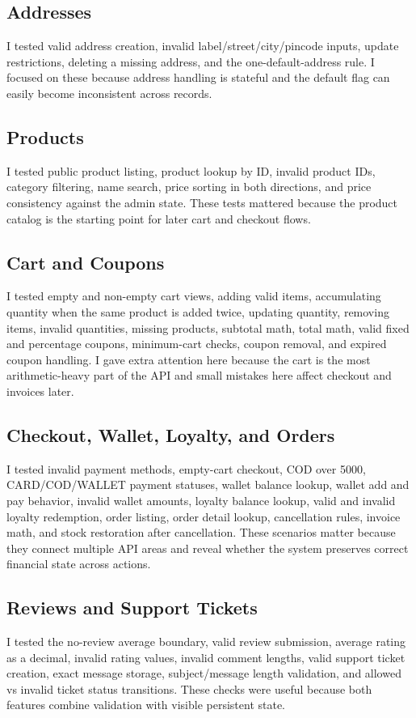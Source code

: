 \documentclass[12pt]{article}
\begin{document}
\subsection{Addresses}
I tested valid address creation, invalid label/street/city/pincode inputs, update restrictions, deleting a missing address, and the one-default-address rule. I focused on these because address handling is stateful and the default flag can easily become inconsistent across records.

\subsection{Products}
I tested public product listing, product lookup by ID, invalid product IDs, category filtering, name search, price sorting in both directions, and price consistency against the admin state. These tests mattered because the product catalog is the starting point for later cart and checkout flows.

\subsection{Cart and Coupons}
I tested empty and non-empty cart views, adding valid items, accumulating quantity when the same product is added twice, updating quantity, removing items, invalid quantities, missing products, subtotal math, total math, valid fixed and percentage coupons, minimum-cart checks, coupon removal, and expired coupon handling. I gave extra attention here because the cart is the most arithmetic-heavy part of the API and small mistakes here affect checkout and invoices later.

\subsection{Checkout, Wallet, Loyalty, and Orders}
I tested invalid payment methods, empty-cart checkout, COD over 5000, CARD/COD/WALLET payment statuses, wallet balance lookup, wallet add and pay behavior, invalid wallet amounts, loyalty balance lookup, valid and invalid loyalty redemption, order listing, order detail lookup, cancellation rules, invoice math, and stock restoration after cancellation. These scenarios matter because they connect multiple API areas and reveal whether the system preserves correct financial state across actions.

\subsection{Reviews and Support Tickets}
I tested the no-review average boundary, valid review submission, average rating as a decimal, invalid rating values, invalid comment lengths, valid support ticket creation, exact message storage, subject/message length validation, and allowed vs invalid ticket status transitions. These checks were useful because both features combine validation with visible persistent state.
\end{document}
